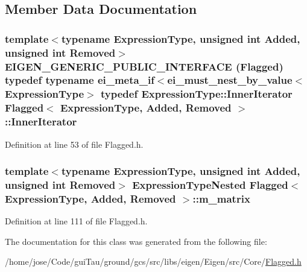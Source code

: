 \subsection{Member Data Documentation}
\hypertarget{class_flagged_a6be6f81b660bb542e3e07f0fc9c12376}{
\subsubsection[{Inner\-Iterator}]{\setlength{\rightskip}{0pt plus 5cm}template$<$typename Expression\-Type, unsigned int Added, unsigned int Removed$>$ E\-I\-G\-E\-N\-\_\-\-G\-E\-N\-E\-R\-I\-C\-\_\-\-P\-U\-B\-L\-I\-C\-\_\-\-I\-N\-T\-E\-R\-F\-A\-C\-E ({\bf Flagged}) typedef typename {\bf ei\-\_\-meta\-\_\-if}$<${\bf ei\-\_\-must\-\_\-nest\-\_\-by\-\_\-value}$<$Expression\-Type$>$ typedef Expression\-Type\-::\-Inner\-Iterator {\bf Flagged}$<$ Expression\-Type, Added, Removed $>$\-::{\bf Inner\-Iterator}}}\label{class_flagged_a6be6f81b660bb542e3e07f0fc9c12376}


Definition at line 53 of file Flagged.\-h.

\hypertarget{class_flagged_a80cbc207a891b6328f769bfb6ee07d83}{
\subsubsection[{m\-\_\-matrix}]{\setlength{\rightskip}{0pt plus 5cm}template$<$typename Expression\-Type, unsigned int Added, unsigned int Removed$>$ Expression\-Type\-Nested {\bf Flagged}$<$ Expression\-Type, Added, Removed $>$\-::m\-\_\-matrix\hspace{0.3cm}{\ttfamily [protected]}}}\label{class_flagged_a80cbc207a891b6328f769bfb6ee07d83}


Definition at line 111 of file Flagged.\-h.



The documentation for this class was generated from the following file\-:\begin{DoxyCompactItemize}
\item 
/home/jose/\-Code/gui\-Tau/ground/gcs/src/libs/eigen/\-Eigen/src/\-Core/\hyperlink{_flagged_8h}{Flagged.\-h}\end{DoxyCompactItemize}
